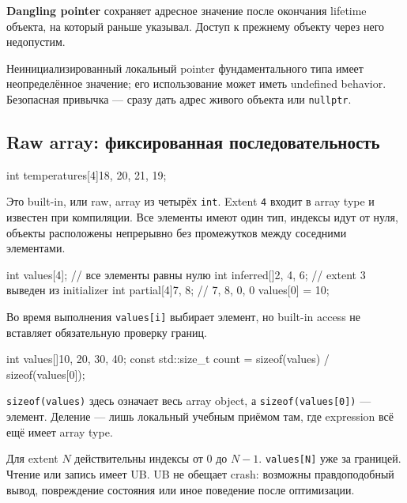 \begin{definition}
\textbf{Dangling pointer} сохраняет адресное значение после окончания lifetime
объекта, на который раньше указывал. Доступ к прежнему объекту через него
недопустим.
\end{definition}

Неинициализированный локальный pointer фундаментального типа имеет
неопределённое значение; его использование может иметь undefined behavior.
Безопасная привычка --- сразу дать адрес живого объекта или \texttt{nullptr}.

\subsection{Raw array: фиксированная последовательность}

\begin{cppcode}
int temperatures[4]{18, 20, 21, 19};
\end{cppcode}

Это built-in, или raw, array из четырёх \texttt{int}. Extent \texttt{4}
входит в array type и известен при компиляции. Все элементы имеют один
тип, индексы идут от нуля, объекты расположены непрерывно без промежутков
между соседними элементами.

\begin{cppcode}
int values[4]{};          // все элементы равны нулю
int inferred[]{2, 4, 6}; // extent 3 выведен из initializer
int partial[4]{7, 8};    // 7, 8, 0, 0
values[0] = 10;
\end{cppcode}

Во время выполнения \texttt{values[i]} выбирает элемент, но built-in access
не вставляет обязательную проверку границ.

\begin{cppcode}
int values[]{10, 20, 30, 40};
const std::size_t count = sizeof(values) / sizeof(values[0]);
\end{cppcode}

\texttt{sizeof(values)} здесь означает весь array object, а
\texttt{sizeof(values[0])} --- элемент. Деление --- лишь локальный
учебным приёмом там, где expression всё ещё имеет array type.

\begin{ubbox}
Для extent $N$ действительны индексы от 0 до $N-1$. \texttt{values[N]} уже
за границей. Чтение или запись имеет UB. UB не обещает crash: возможны
правдоподобный вывод, повреждение состояния или иное поведение после
оптимизации.
\end{ubbox}

